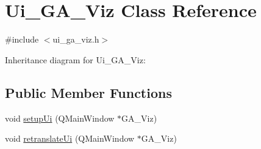 \hypertarget{class_ui___g_a___viz}{}\section{Ui\+\_\+\+G\+A\+\_\+\+Viz Class Reference}
\label{class_ui___g_a___viz}


{\ttfamily \#include $<$ui\+\_\+ga\+\_\+viz.\+h$>$}



Inheritance diagram for Ui\+\_\+\+G\+A\+\_\+\+Viz\+:
\subsection*{Public Member Functions}
\begin{DoxyCompactItemize}
\item 
void \hyperlink{class_ui___g_a___viz_ada69ff51a9e72bafaab83004fdeca1ea}{setup\+Ui} (Q\+Main\+Window $\ast$G\+A\+\_\+\+Viz)
\item 
void \hyperlink{class_ui___g_a___viz_a7b2fb4dab37d5c96f3e8ccd6f49498b9}{retranslate\+Ui} (Q\+Main\+Window $\ast$G\+A\+\_\+\+Viz)
\end{DoxyCompactItemize}

